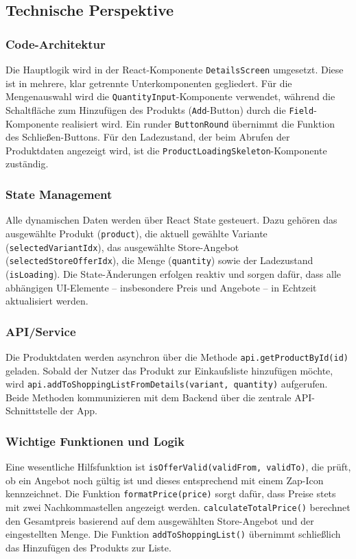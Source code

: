 \subsection{Technische Perspektive}

\subsubsection{Code-Architektur}
Die Hauptlogik wird in der React-Komponente \texttt{DetailsScreen} umgesetzt. Diese ist in mehrere, klar getrennte Unterkomponenten gegliedert. Für die Mengenauswahl wird die \texttt{QuantityInput}-Komponente verwendet, während die Schaltfläche zum Hinzufügen des Produkts (\texttt{Add}-Button) durch die \texttt{Field}-Komponente realisiert wird. Ein runder \texttt{ButtonRound} übernimmt die Funktion des Schließen-Buttons. Für den Ladezustand, der beim Abrufen der Produktdaten angezeigt wird, ist die \texttt{ProductLoadingSkeleton}-Komponente zuständig.

\subsubsection{State Management}
Alle dynamischen Daten werden über React State gesteuert. Dazu gehören das ausgewählte Produkt (\texttt{product}), die aktuell gewählte Variante (\texttt{selectedVariantIdx}), das ausgewählte Store-Angebot (\texttt{selectedStoreOfferIdx}), die Menge (\texttt{quantity}) sowie der Ladezustand (\texttt{isLoading}). Die State-Änderungen erfolgen reaktiv und sorgen dafür, dass alle abhängigen UI-Elemente – insbesondere Preis und Angebote – in Echtzeit aktualisiert werden.

\subsubsection{API/Service}
Die Produktdaten werden asynchron über die Methode \texttt{api.getProductById(id)} geladen. Sobald der Nutzer das Produkt zur Einkaufsliste hinzufügen möchte, wird \texttt{api.addToShoppingListFromDetails(variant, quantity)} aufgerufen. Beide Methoden kommunizieren mit dem Backend über die zentrale API-Schnittstelle der App.

\subsubsection{Wichtige Funktionen und Logik}
Eine wesentliche Hilfsfunktion ist \texttt{isOfferValid(validFrom, validTo)}, die prüft, ob ein Angebot noch gültig ist und dieses entsprechend mit einem Zap-Icon kennzeichnet. Die Funktion \texttt{formatPrice(price)} sorgt dafür, dass Preise stets mit zwei Nachkommastellen angezeigt werden. \texttt{calculateTotalPrice()} berechnet den Gesamtpreis basierend auf dem ausgewählten Store-Angebot und der eingestellten Menge. Die Funktion \texttt{addToShoppingList()} übernimmt schließlich das Hinzufügen des Produkts zur Liste.


